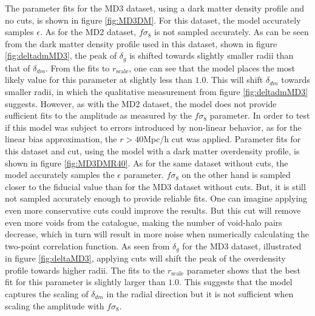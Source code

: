 The parameter fits for the MD3 dataset, using a dark matter density profile and no cuts, is shown in figure \ref{fig:MD3DM}. For this dataset, the model accurately samples $\epsilon$. As for the MD2 dataset, $f\sigma_8$ is not sampled accurately. As can be seen from the dark matter density profile used in this dataset, shown in figure \ref{fig:deltadmMD3}, the peak of $\delta_g$ is shifted towards slightly smaller radii than that of $\delta_{dm}$. From the fits to $r_{\mathrm{scale}}$, one can see that the model places the most likely value for this parameter at slightly less than $1.0$. This will shift $\delta_{dm}$ towards smaller radii, in which the qualitative measurement from figure \ref{fig:deltadmMD3} suggests. However, as with the MD2 dataset, the model does not provide sufficient fits to the amplitude as measured by the $f\sigma_8$ parameter. In order to test if this model was subject to errors introduced by non-linear behavior, as for the linear bias approximation, the $r>40$Mpc/h cut was applied. Parameter fits for this dataset and cut, using the model with a dark matter overdensity profile, is shown in figure \ref{fig:MD3DMR40}. As for the same dataset without cuts, the model accurately samples the $\epsilon$ parameter. $f\sigma_8$ on the other hand is sampled closer to the fiducial value than for the MD3 dataset without cuts. But, it is still not sampled accurately enough to provide reliable fits. One can imagine applying even more conservative cuts could improve the results. But this cut will remove even more voids from the catalogue, making the number of void-halo pairs decrease, which in turn will result in more noise when numerically calculating the two-point correlation function. As seen from $\delta_g$ for the MD3 dataset, illustrated in figure \ref{fig:deltaMD3}, applying cuts will shift the peak of the overdensity profile towards higher radii. The fits to the $r_{\mathrm{scale}}$ parameter shows that the best fit for this parameter is slightly larger than $1.0$. This suggests that the model captures the scaling of $\delta_{dm}$ in the radial direction but it is not sufficient when scaling the amplitude with $f\sigma_8$.\\\indent

